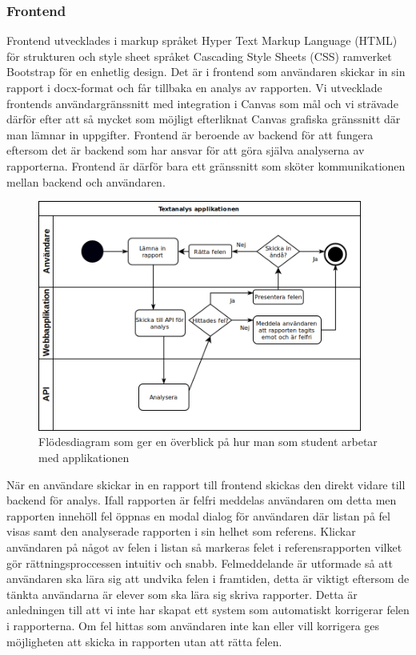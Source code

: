 \documentclass[swedish]{maucsthesis}
\begin{document}
\subsubsection{Frontend}

Frontend utvecklades i markup språket Hyper Text Markup Language (HTML) för
strukturen och style sheet språket Cascading Style Sheets (CSS) ramverket
Bootstrap för en enhetlig design. Det är i frontend som användaren skickar in
sin rapport i docx-format och får tillbaka en analys av rapporten. Vi utvecklade
frontends användargränssnitt med integration i Canvas som mål och vi strävade
därför efter att så mycket som möjligt efterliknat Canvas grafiska gränssnitt
där man lämnar in uppgifter. Frontend är beroende av backend för att fungera
eftersom det är backend som har ansvar för att göra själva analyserna av
rapporterna. Frontend är därför bara ett gränssnitt som sköter kommunikationen
mellan backend och användaren.

\begin{figure}[H]
    \centering
    \includegraphics[width=0.95\textwidth]{overviewflow.png}
    \caption{Flödesdiagram som ger en överblick på hur man som student arbetar
      med applikationen}
    \label{fig:overviewflow}
\end{figure}

När en användare skickar in en rapport till frontend skickas den direkt vidare
till backend för analys. Ifall rapporten är felfri meddelas användaren om detta
men rapporten innehöll fel öppnas en modal dialog för användaren där listan på
fel visas samt den analyserade rapporten i sin helhet som referens. Klickar
användaren på något av felen i listan så markeras felet i referensrapporten
vilket gör rättningsproccessen intuitiv och snabb. Felmeddelande är utformade så
att användaren ska lära sig att undvika felen i framtiden, detta är viktigt
eftersom de tänkta användarna är elever som ska lära sig skriva rapporter. Detta
är anledningen till att vi inte har skapat ett system som automatiskt korrigerar
felen i rapporterna. Om fel hittas som användaren inte kan eller vill korrigera
ges möjligheten att skicka in rapporten utan att rätta felen.
\end{document}
